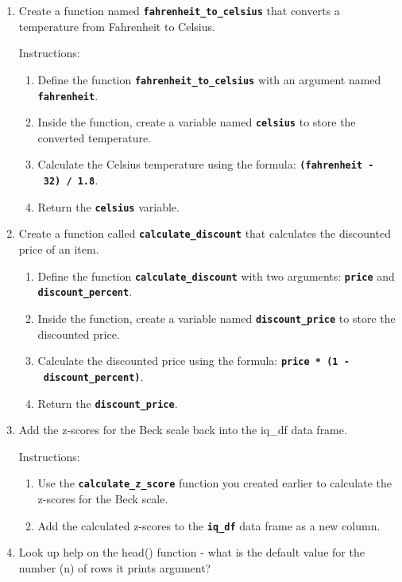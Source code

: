 \documentclass[
]{book}
\begin{document}
\begin{enumerate}
\def\labelenumi{\arabic{enumi}.}
\item
  Create a function named \textbf{\texttt{fahrenheit\_to\_celsius}} that converts a temperature from Fahrenheit to Celsius.

  Instructions:

  \begin{enumerate}
  \def\labelenumii{\arabic{enumii}.}
  \item
    Define the function \textbf{\texttt{fahrenheit\_to\_celsius}} with an argument named \textbf{\texttt{fahrenheit}}.
  \item
    Inside the function, create a variable named \textbf{\texttt{celsius}} to store the converted temperature.
  \item
    Calculate the Celsius temperature using the formula: \textbf{\texttt{(fahrenheit\ -\ 32)\ /\ 1.8}}.
  \item
    Return the \textbf{\texttt{celsius}} variable.
  \end{enumerate}
\item
  Create a function called \textbf{\texttt{calculate\_discount}} that calculates the discounted price of an item.

  \begin{enumerate}
  \def\labelenumii{\arabic{enumii}.}
  \item
    Define the function \textbf{\texttt{calculate\_discount}} with two arguments: \textbf{\texttt{price}} and \textbf{\texttt{discount\_percent}}.
  \item
    Inside the function, create a variable named \textbf{\texttt{discount\_price}} to store the discounted price.
  \item
    Calculate the discounted price using the formula: \textbf{\texttt{price\ *\ (1\ -\ discount\_percent)}}.
  \item
    Return the \textbf{\texttt{discount\_price}}.
  \end{enumerate}
\item
  Add the z-scores for the Beck scale back into the iq\_df data frame.

  Instructions:

  \begin{enumerate}
  \def\labelenumii{\arabic{enumii}.}
  \item
    Use the \textbf{\texttt{calculate\_z\_score}} function you created earlier to calculate the z-scores for the Beck scale.
  \item
    Add the calculated z-scores to the \textbf{\texttt{iq\_df}} data frame as a new column.
  \end{enumerate}
\item
  Look up help on the head() function - what is the default value for the number (n) of rows it prints argument?


\end{enumerate}
\end{document}
